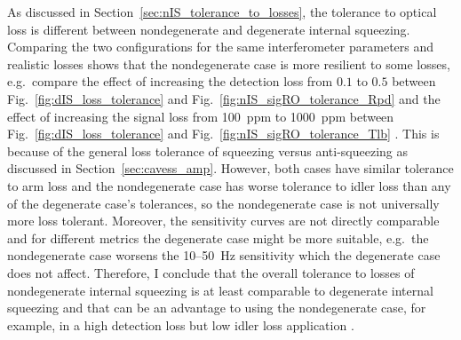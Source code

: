 As discussed in Section~\ref{sec:nIS_tolerance_to_losses}, the tolerance to optical loss is different between nondegenerate and degenerate internal squeezing. Comparing the two configurations for the same interferometer parameters and realistic losses shows that the nondegenerate case is more resilient to some losses, e.g.\ compare the effect of increasing the detection loss from $0.1$ to $0.5$ between Fig.~\ref{fig:dIS_loss_tolerance} and Fig.~\ref{fig:nIS_sigRO_tolerance_Rpd} and the effect of increasing the signal loss from 100~ppm to 1000~ppm between Fig.~\ref{fig:dIS_loss_tolerance} and Fig.~\ref{fig:nIS_sigRO_tolerance_Tlb} . 
This is because of the general loss tolerance of squeezing versus anti-squeezing as discussed in Section~\ref{sec:cavess_amp}. %
However, both cases have similar tolerance to arm loss and the nondegenerate case has worse tolerance to idler loss than any of the degenerate case's tolerances, so the nondegenerate case is not universally more loss tolerant.  
Moreover, the sensitivity curves are not directly comparable and for different metrics the degenerate case might be more suitable, e.g.\ the nondegenerate case worsens the 10--50~Hz sensitivity which the degenerate case does not affect. %
Therefore, I conclude that the overall tolerance to losses of nondegenerate internal squeezing is at least comparable to degenerate internal squeezing and that can be an advantage to using the nondegenerate case, for example, in a high detection loss but low idler loss application . 


